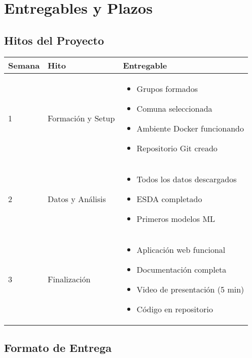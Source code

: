 \documentclass[12pt,a4paper]{article}
\begin{document}
\section{Entregables y Plazos}

\subsection{Hitos del Proyecto}

\begin{table}[H]
\centering
\begin{tabular}{llp{6cm}}
\toprule
\textbf{Semana} & \textbf{Hito} & \textbf{Entregable} \\
\midrule
1 & Formación y Setup &
\begin{itemize}[leftmargin=*,topsep=0pt,itemsep=0pt]
    \item Grupos formados
    \item Comuna seleccionada
    \item Ambiente Docker funcionando
    \item Repositorio Git creado
\end{itemize} \\
\midrule
2 & Datos y Análisis &
\begin{itemize}[leftmargin=*,topsep=0pt,itemsep=0pt]
    \item Todos los datos descargados
    \item ESDA completado
    \item Primeros modelos ML
\end{itemize} \\
\midrule
3 & Finalización &
\begin{itemize}[leftmargin=*,topsep=0pt,itemsep=0pt]
    \item Aplicación web funcional
    \item Documentación completa
    \item Video de presentación (5 min)
    \item Código en repositorio
\end{itemize} \\
\bottomrule
\end{tabular}
\end{table}

\subsection{Formato de Entrega}
\end{document}

